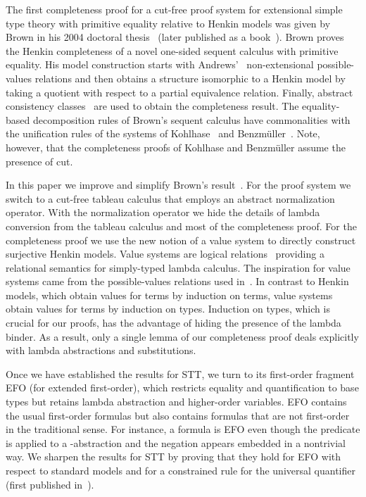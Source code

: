 The first completeness proof for a cut-free proof system
for extensional simple type theory with primitive equality
relative to Henkin models was given by
Brown in his 2004 doctoral thesis~\cite{Brown2004a}
(later published as a book~\cite{BrownARHO}).  Brown
proves the Henkin completeness of a novel one-sided
sequent calculus with primitive equality.  His model
construction starts with Andrews'~\cite{Andrews71}
non-extensional possible-values relations and then
obtains a structure isomorphic to a Henkin model by
taking a quotient with respect to a partial equivalence
relation.  Finally, abstract consistency
classes~\cite{SmullyanBook,Andrews71} are used to
obtain the completeness result.  The equality-based
decomposition rules of Brown's sequent calculus have
commonalities with the unification rules of the systems
of Kohlhase~\cite{KohlhaseTableaux1995} and
Benzm\"uller~\cite{Benzmuller99b}.  Note, however, that
the completeness proofs of Kohlhase and Benzm\"uller
assume the presence of cut.

In this paper we improve and simplify Brown's
result~\cite{BrownARHO}.  
For the proof system we
switch to a cut-free tableau calculus  that employs an
abstract normalization operator.  With the
normalization operator we hide the details of lambda
conversion from the tableau calculus and most of the
completeness proof.  For the completeness proof we use
the new notion of a value system to directly construct
surjective Henkin models.  Value systems are logical
relations~\cite{Statman85a} providing a relational
semantics for simply-typed lambda calculus.  The
inspiration for value systems came from the
possible-values relations used
in~\cite{BrownARHO,BrownSmolkaBasic,BrownSmolkaEFO}.
In contrast to Henkin models, which obtain values for
terms by induction on terms, value systems obtain
values for terms by induction on types.  Induction on
types, which is crucial for our proofs, has the
advantage of hiding the presence of the lambda binder.
As a result, only a single lemma of our completeness
proof deals explicitly with lambda abstractions and
substitutions.

Once we have established the results for STT, we turn
to its first-order fragment EFO (for extended
first-order), which restricts equality and
quantification to base types but retains lambda
abstraction and higher-order variables.  EFO contains
the usual first-order formulas but also contains
formulas that are not first-order in the traditional
sense.  For instance, a formula 
is EFO even though the predicate  is applied to a
-abstraction and the negation appears embedded
in a nontrivial way.  We sharpen the results for STT by
proving that they hold for EFO with respect to standard
models and for a constrained rule for the universal
quantifier (first published in~\cite{BrownSmolkaEFO}).

